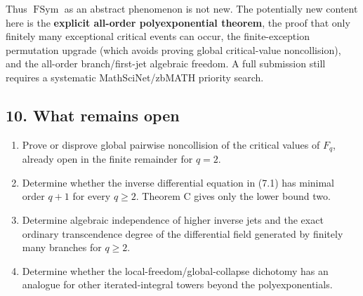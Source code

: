 Thus \(\operatorname{FSym}\) as an abstract phenomenon is not new. The
potentially new content here is the \textbf{explicit all-order polyexponential
theorem}, the proof that only finitely many exceptional critical events can
occur, the finite-exception permutation upgrade (which avoids proving global
critical-value noncollision), and the all-order branch/first-jet algebraic
freedom. A full submission still requires a systematic MathSciNet/zbMATH
priority search.

\subsection{10. What remains open}

\begin{enumerate}
\def\labelenumi{\arabic{enumi}.}
\tightlist
\item
  Prove or disprove global pairwise noncollision of the critical values of
  \(F_q\), already open in the finite remainder for \(q=2\).
\item
  Determine whether the inverse differential equation in (7.1) has minimal
  order \(q+1\) for every \(q\geq2\). Theorem C gives only the lower bound
  two.
\item
  Determine algebraic independence of higher inverse jets and the exact
  ordinary transcendence degree of the differential field generated by
  finitely many branches for \(q\geq2\).
\item
  Determine whether the local-freedom/global-collapse dichotomy has an
  analogue for other iterated-integral towers beyond the polyexponentials.
\end{enumerate}
